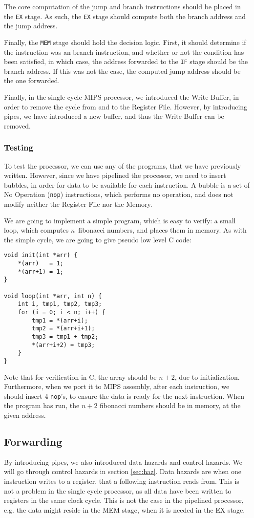 The core computation of the jump and branch instructions should be placed in
the \texttt{EX} stage. As such, the \texttt{EX} stage should compute both the
branch address and the jump address.

Finally, the \texttt{MEM} stage should hold the decision logic. First, it
should determine if the instruction was an branch instruction, and whether or
not the condition has been satisfied, in which case, the  address forwarded to
the \texttt{IF} stage should be the branch address. If this was not the case,
the computed jump address should be the one forwarded.

Finally, in the single cycle MIPS processor, we introduced the Write Buffer, in
order to remove the cycle from and to the Register File. However, by
introducing pipes, we have introduced a new buffer, and thus the Write Buffer
can be removed.

\subsubsection*{Testing}
To test the processor, we can use any of the programs, that we have previously
written. However, since we have pipelined the processor, we need to insert
bubbles, in order for data to be available for each instruction. A bubble is a
set of No Operation (\texttt{nop}) instructions, which performs no operation,
and does not modify neither the Register File nor the Memory.

We are going to implement a simple program, which is easy to verify: a small
loop, which computes $n$ fibonacci numbers, and places them in memory. As with
the simple cycle, we are going to give pseudo low level C code:
\begin{lstlisting}
void init(int *arr) {
    *(arr)   = 1;
    *(arr+1) = 1;
}

void loop(int *arr, int n) {
    int i, tmp1, tmp2, tmp3;
    for (i = 0; i < n; i++) {
        tmp1 = *(arr+i);
        tmp2 = *(arr+i+1);
        tmp3 = tmp1 + tmp2;
        *(arr+i+2) = tmp3;
    }
}
\end{lstlisting}
Note that for verification in C, the array should be $n+2$, due to
initialization. Furthermore, when we port it to MIPS assembly, after each
instruction, we should insert 4 \texttt{nop}'s, to ensure the data is ready for
the next instruction. When the program has run, the $n+2$ fibonacci numbers
should be in memory, at the given address.

\subsection{Forwarding}\label{sec:forw}
By introducing pipes, we also introduced data hazards and control hazards. We
will go through control hazards in section \ref{sec:haz}. Data hazards are when
one instruction writes to a register, that a following instruction reads from.
This is not a problem in the single cycle processor, as all data have been
written to registers in the same clock cycle. This is not the case in the
pipelined processor, e.g. the data might reside in the MEM stage, when it is
needed in the EX stage.

